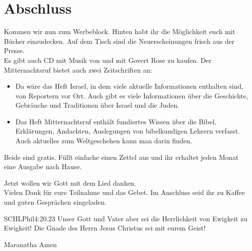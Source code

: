 \documentclass{../inc/mybib}
\begin{document}
\section{Abschluss}
Kommen wir nun zum Werbeblock. Hinten habt ihr die Möglichkeit euch mit Bücher einzudecken. Auf dem Tisch sind die Neuerscheinungen frisch aus der Presse.\\
Es gibt auch CD mit Musik von und mit Govert Rose zu kaufen.
Der Mitternachtsruf bietet auch zwei Zeitschriften an:
\begin{itemize}
    \item Da wäre das Heft Israel, in dem viele aktuelle Informationen enthalten sind, von Reportern vor Ort. Auch gibt es viele Informationen über die Geschichte, Gebräuche und Traditionen über Israel und die Juden.
    \item Das Heft Mitternachtsruf enthält fundiertes Wissen über die Bibel, Erklärungen, Andachten, Auslegungen von bibelkundigen Lehrern verfasst. Auch aktuelles zum Weltgeschehen kann man darin finden.
\end{itemize}
Beide sind gratis. Füllt einfache einen Zettel aus und ihr erhaltet jeden Monat eine Ausgabe nach Hause.

Jetzt wollen wir Gott mit dem Lied  danken.\\
Vielen Dank für eure Teilnahme und das Gebet. Im Anschluss seid ihr zu Kaffee und guten Gesprächen eingeladen.
\beten{} \\

\begin{bibelbox}{SCHL}{Phil}{4:20.23}
Unser Gott und Vater aber sei die Herrlichkeit von Ewigkeit zu Ewigkeit!
Die Gnade des Herrn Jesus Christus sei mit eurem Geist!
\end{bibelbox}
Maranatha Amen
\end{document}
